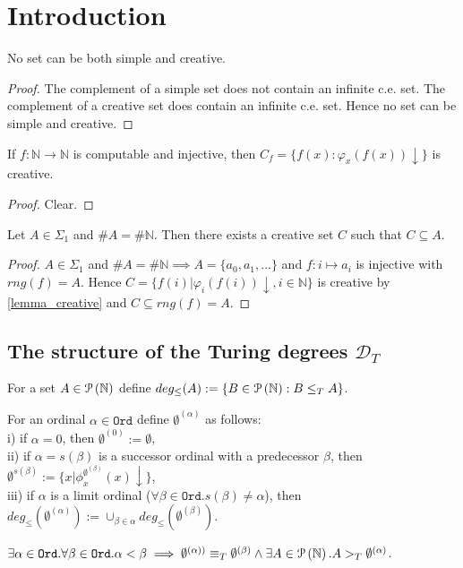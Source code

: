 \chapter{Introduction}

\begin{proposition}
No set can be both simple and creative.
\end{proposition}

\begin{proof}
The complement of a simple set does not contain an infinite c.e. set. The complement of a creative set does contain an infinite c.e. set. Hence no set can be simple and creative.
\end{proof}

\begin{lemma}\label{lemma_creative}
If $f : \mathbb{N} \to \mathbb{N}$ is computable and injective, then $C_f = \{f(x) : \varphi_x(f(x))\downarrow \}$ is creative.
\end{lemma}
\begin{proof}
Clear.
\end{proof}

\begin{proposition}
Let $A \in \Sigma_1$ and $\#A = \#\mathbb{N}$. Then there exists a creative set $C$ such that $C \subseteq A$.
\end{proposition}

\begin{proof}
$A \in \Sigma_1$ and $\#A = \#\mathbb{N} \implies A=\{a_0, a_1, ... \}$ and $f:i \mapsto a_i$ is injective with $rng(f)=A$. 
Hence $C=\{f(i) | \varphi_i(f(i))\downarrow, i \in \mathbb{N}\}$ is creative by \autoref{lemma_creative} and $C \subseteq	 rng(f) = A$.
\end{proof}

\section{The structure of the Turing degrees $\mathcal{D}_T$}

\begin{defn}For a set $A \in \mathcal{P} \left({ \mathbb{N} }\right)$ define $deg_\le(A):=\{B \in \mathcal{P} \left({ \mathbb{N} }\right) : B \le_T A \}$.
\end{defn}

\begin{defn}For an ordinal $\alpha \in \mathtt{Ord}$ define $\emptyset^{(\alpha)}$ as follows:\\
i) if $\alpha=0$, then $\emptyset^{(0)}:=\emptyset$,\\
ii) if $\alpha=s(\beta)$ is a successor ordinal with a predecessor $\beta$, then $\emptyset^{s(\beta)}:=\{x | \phi^{\emptyset^{(\beta)}}_x(x) \downarrow \}$,\\
iii) if $\alpha$ is a limit ordinal ($\forall \beta \in \mathtt{Ord}. s(\beta) \not = \alpha$), then $deg_\le(\emptyset^{(\alpha)}):=\cup_{\beta \in \alpha} deg_\le(\emptyset^{(\beta)})$.
\end{defn}

\begin{proposition}
$\exists \alpha \in \mathtt{Ord}. \forall \beta \in \mathtt{Ord}. \alpha < \beta \implies \emptyset^{(\alpha))} \equiv_T \emptyset^{(\beta)} \land \exists A \in \mathcal{P} \left({ \mathbb{N} }\right). A >_T \emptyset^{(\alpha)}$.
\end{proposition}


